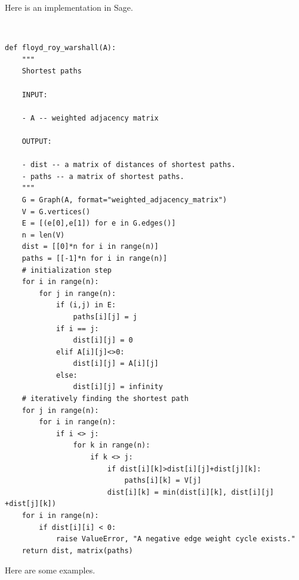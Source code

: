 Here is an implementation in Sage.
%
\begin{center}
\fontsize{9pt}{9pt}
\selectfont
\tt
\begin{lstlisting}
def floyd_roy_warshall(A):
    """
    Shortest paths

    INPUT:

    - A -- weighted adjacency matrix

    OUTPUT:

    - dist -- a matrix of distances of shortest paths.
    - paths -- a matrix of shortest paths.
    """
    G = Graph(A, format="weighted_adjacency_matrix")
    V = G.vertices()
    E = [(e[0],e[1]) for e in G.edges()]
    n = len(V)
    dist = [[0]*n for i in range(n)]
    paths = [[-1]*n for i in range(n)]
    # initialization step
    for i in range(n):
        for j in range(n):
            if (i,j) in E:
                paths[i][j] = j
            if i == j:
                dist[i][j] = 0
            elif A[i][j]<>0:
                dist[i][j] = A[i][j]
            else:
                dist[i][j] = infinity
    # iteratively finding the shortest path
    for j in range(n):
        for i in range(n):
            if i <> j:
                for k in range(n):
                    if k <> j:
                        if dist[i][k]>dist[i][j]+dist[j][k]:
                            paths[i][k] = V[j]
                        dist[i][k] = min(dist[i][k], dist[i][j] +dist[j][k])
    for i in range(n):
        if dist[i][i] < 0:
            raise ValueError, "A negative edge weight cycle exists."
    return dist, matrix(paths)
\end{lstlisting}
\end{center}

Here are some examples.

%
%
%
%

%
%
%
%

